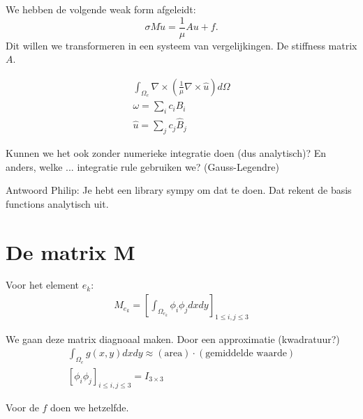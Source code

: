 We hebben de volgende weak form afgeleidt:
\begin{equation}
    \sigma M \dot u = \frac{1}{\mu}A u + f.
\end{equation}
Dit willen we transformeren in een systeem van vergelijkingen. De stiffness matrix $A$.

\begin{align*}
    \int_{\Omega_e} \nabla \times \left(\frac{1}{\mu} \nabla \times \hat u\right) d \Omega \\
    \omega = \sum_i c_i B_i\\
    \hat u = \sum_j c_j \hat B_j
\end{align*}

Kunnen we het ook zonder numerieke integratie doen (dus analytisch)? En anders, welke ... integratie rule gebruiken we? (Gauss-Legendre)

Antwoord Philip: Je hebt een library sympy om dat te doen. Dat rekent de basis functions analytisch uit.

\section{De matrix M}

Voor het element $e_k$:
\begin{align*}
    M_{e_k} = \left[\int_{\Omega_{e_k}}\phi_i\phi_jdxdy\right]_{1 \leq i, j \leq 3}
\end{align*}

We gaan deze matrix diagnoaal maken. Door een approximatie (kwadratuur?)
\begin{align*}
    \int_{\Omega_e}g(x,y)dxdy \approx (\text{area}) \cdot (\text{gemiddelde waarde}) \\
    \left[\phi_i\phi_j\right]_{i \leq i,j \leq 3} = I_{3 \times 3}
\end{align*}

Voor de $f$ doen we hetzelfde.
